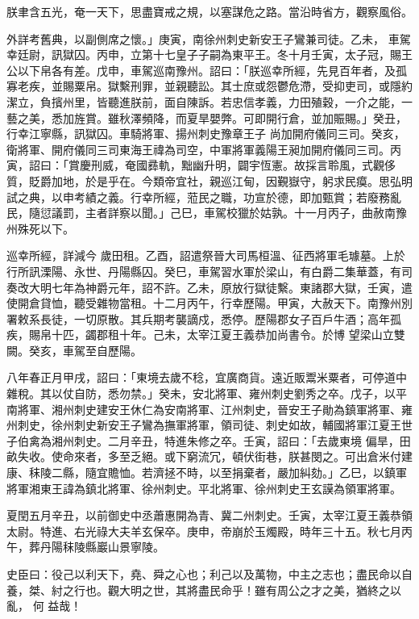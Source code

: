 \begin{pinyinscope}
 朕聿含五光，奄一天下，思盡寶戒之規，以塞謀危之路。當沿時省方，觀察風俗。



 外詳考舊典，以副側席之懷。」庚寅，南徐州刺史新安王子鸞兼司徒。乙未，
 車駕幸廷尉，訊獄囚。丙申，立第十七皇子子嗣為東平王。冬十月壬寅，太子冠，賜王公以下帛各有差。戊申，車駕巡南豫州。詔曰：「朕巡幸所經，先見百年者，及孤寡老疾，並賜粟帛。獄繫刑罪，並親聽訟。其士庶或怨鬱危滯，受抑吏司，或隱約潔立，負擯州里，皆聽進朕前，面自陳訴。若忠信孝義，力田殖穀，一介之能，一藝之美，悉加旌賞。雖秋澤頻降，而夏旱嬰弊。可即開行倉，並加賑賜。」癸丑，行幸江寧縣，訊獄囚。車騎將軍、揚州刺史豫章王子
 尚加開府儀同三司。癸亥，衛將軍、開府儀同三司東海王禕為司空，中軍將軍義陽王昶加開府儀同三司。丙寅，詔曰：「賞慶刑威，奄國彞軌，黜幽升明，闢宇恆憲。故採言聆風，式觀侈質，貶爵加地，於是乎在。今類帝宜社，親巡江甸，因覲嶽守，躬求民瘼。思弘明試之典，以申考績之義。行幸所經，蒞民之職，功宣於德，即加甄賞；若廢務亂民，隨愆議罰，主者詳察以聞。」己巳，車駕校獵於姑孰。十一月丙子，曲赦南豫州殊死以下。



 巡幸所經，詳減今
 歲田租。乙酉，詔遣祭晉大司馬桓溫、征西將軍毛璩墓。上於行所訊溧陽、永世、丹陽縣囚。癸巳，車駕習水軍於梁山，有白爵二集華蓋，有司奏改大明七年為神爵元年，詔不許。乙未，原放行獄徒繫。東諸郡大獄，壬寅，遣使開倉貸恤，聽受雜物當租。十二月丙午，行幸歷陽。甲寅，大赦天下。南豫州別署敕系長徒，一切原散。其兵期考襲謫戍，悉停。歷陽郡女子百戶牛酒；高年孤疾，賜帛十匹，蠲郡租十年。己未，太宰江夏王義恭加尚書令。於博
 望梁山立雙闕。癸亥，車駕至自歷陽。



 八年春正月甲戌，詔曰：「東境去歲不稔，宜廣商貨。遠近販鬻米粟者，可停道中雜稅。其以仗自防，悉勿禁。」癸未，安北將軍、雍州刺史劉秀之卒。戊子，以平南將軍、湘州刺史建安王休仁為安南將軍、江州刺史，晉安王子勛為鎮軍將軍、雍州刺史，徐州刺史新安王子鸞為撫軍將軍，領司徒、刺史如故，輔國將軍江夏王世子伯禽為湘州刺史。二月辛丑，特進朱修之卒。壬寅，詔曰：「去歲東境
 偏旱，田畝失收。使命來者，多至乏絕。或下窮流冗，頓伏街巷，朕甚閔之。可出倉米付建康、秣陵二縣，隨宜贍恤。若濟拯不時，以至捐棄者，嚴加糾劾。」乙巳，以鎮軍將軍湘東王諱為鎮北將軍、徐州刺史。平北將軍、徐州刺史王玄謨為領軍將軍。



 夏閏五月辛丑，以前御史中丞蕭惠開為青、冀二州刺史。壬寅，太宰江夏王義恭領太尉。特進、右光祿大夫羊玄保卒。庚申，帝崩於玉燭殿，時年三十五。秋七月丙午，葬丹陽秣陵縣巖山景寧陵。



 史臣曰：役己以利天下，堯、舜之心也；利己以及萬物，中主之志也；盡民命以自養，桀、紂之行也。觀大明之世，其將盡民命乎！雖有周公之才之美，猶終之以亂，
 何
 益哉！



\end{pinyinscope}